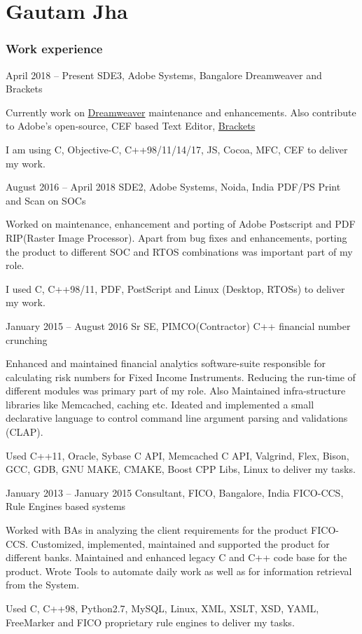 \documentclass{tccv}
\begin{document}
\part{Gautam Jha}

\section{Work experience}

\begin{eventlist}

\item{April 2018 -- Present}
     {SDE3, Adobe Systems, Bangalore}
     {Dreamweaver and Brackets}
     
Currently work on \href{https://www.adobe.com/in/products/dreamweaver.html}{Dreamweaver} maintenance and enhancements. Also contribute to Adobe's open-source, CEF based Text Editor, \href{https://github.com/adobe/brackets}{Brackets}

I am using C, Objective-C, C++98/11/14/17, JS, Cocoa, MFC, CEF to deliver my work.

\item{August 2016 -- April 2018}
     {SDE2, Adobe Systems, Noida, India}
     {PDF/PS Print and Scan on SOCs}

Worked on maintenance, enhancement and porting of Adobe Postscript and PDF RIP(Raster Image Processor). Apart from bug fixes and enhancements, porting the product to different SOC and RTOS combinations was important part of my role.

I used C, C++98/11, PDF, PostScript and Linux (Desktop, RTOSs) to deliver my work.

\item{January 2015 -- August 2016}
     {Sr SE, PIMCO(Contractor)}
     {C++ financial number crunching}

Enhanced and maintained financial analytics software-suite responsible for calculating risk numbers for Fixed Income Instruments. Reducing the run-time of different modules was primary part of my role. Also Maintained infra-structure libraries like Memcached, caching etc.
Ideated and implemented a small declarative language to control command line argument
parsing and validations (CLAP).

Used C++11, Oracle, Sybase C API, Memcached C API, Valgrind, Flex, Bison, GCC, GDB, GNU
MAKE, CMAKE, Boost CPP Libs, Linux to deliver my tasks.

\item{January 2013 -- January 2015}
     {Consultant, FICO, Bangalore, India}
     {FICO-CCS, Rule Engines based systems}

Worked with BAs in analyzing the client requirements for the product FICO-CCS.
Customized, implemented, maintained and supported the product for different banks.
Maintained and enhanced legacy C and C++ code base for the product.
Wrote Tools to automate daily work as well as for information retrieval from the System.

Used C, C++98, Python2.7, MySQL, Linux, XML, XSLT, XSD, YAML, FreeMarker and FICO
proprietary rule engines to deliver my tasks.
\end{eventlist}
\end{document}

